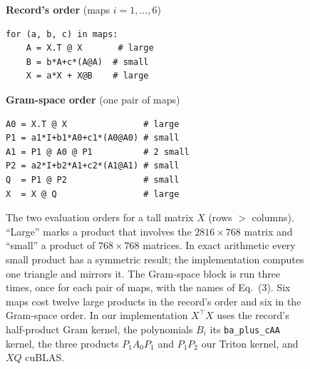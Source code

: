 \documentclass{article}
\begin{document}
\begin{figure}[!htb]\small
\begin{minipage}[t]{0.47\linewidth}
\textbf{Record's order} (maps $i=1,\dots,6$)
\begin{Verbatim}[fontsize=\small]
for (a, b, c) in maps:
    A = X.T @ X       # large
    B = b*A+c*(A@A)  # small
    X = a*X + X@B    # large
\end{Verbatim}
\end{minipage}\hfill
\begin{minipage}[t]{0.5\linewidth}
\textbf{Gram-space order} (one pair of maps)
\begin{Verbatim}[fontsize=\small]
A0 = X.T @ X               # large
P1 = a1*I+b1*A0+c1*(A0@A0) # small
A1 = P1 @ A0 @ P1          # 2 small
P2 = a2*I+b2*A1+c2*(A1@A1) # small
Q  = P1 @ P2               # small
X  = X @ Q                 # large
\end{Verbatim}
\end{minipage}
\caption{The two evaluation orders for a tall matrix $X$ (rows $>$ columns). ``Large'' marks a product that involves the $2816\times768$ matrix and ``small'' a product of $768\times768$ matrices. In exact arithmetic every small product has a symmetric result; the implementation computes one triangle and mirrors it. The Gram-space block is run three times, once for each pair of maps, with the names of Eq.~(3). Six maps cost twelve large products in the record's order and six in the Gram-space order. In our implementation $X^\top X$ uses the record's half-product Gram kernel, the polynomials $B_i$ its \texttt{ba\_plus\_cAA} kernel, the three products $P_1A_0P_1$ and $P_1P_2$ our Triton kernel, and $XQ$ cuBLAS.}\label{fig:algo}
\end{figure}
\end{document}
